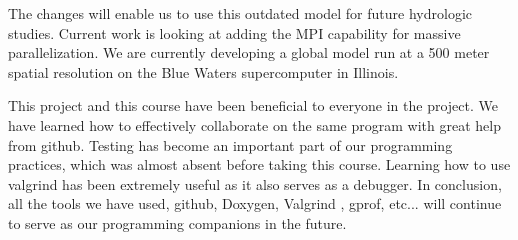 \documentclass[pdftex,12pt,a4paper]{article}
\begin{document}
The changes will enable us to use this outdated model for future hydrologic studies. Current work is looking at adding the MPI capability for massive parallelization. We are currently developing a global model run at a 500 meter spatial resolution on the Blue Waters supercomputer in Illinois. 

This project and this course have been beneficial to everyone in the project. We have learned how to effectively collaborate on the same program with great help from github. Testing has become an important part of our programming practices, which was almost absent before taking this course. Learning how to use valgrind has been extremely useful as it also serves as a debugger. In conclusion, all the tools we have used, github, Doxygen, Valgrind , gprof, etc... will continue to serve as our programming companions in the future.
\end{document}
